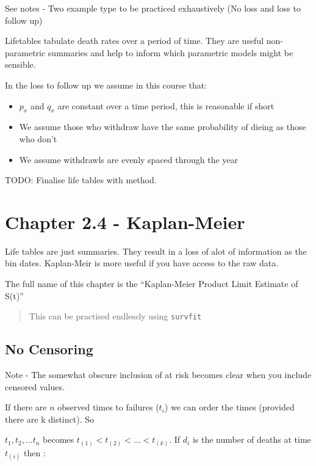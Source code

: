 \documentclass[
  letterpaper,
  DIV=11,
  numbers=noendperiod]{scrreprt}
\providecommand{\tightlist}{%
  \setlength{\itemsep}{0pt}\setlength{\parskip}{0pt}}\usepackage{longtable,booktabs,array}
\begin{document}
See notes - Two example type to be practiced exhaustively (No loss and
loss to follow up)

Lifetables tabulate death rates over a period of time. They are useful
non-parametric summaries and help to inform which parametric models
might be sensible.

In the loss to follow up we assume in this course that:

\begin{itemize}
\tightlist
\item
  \(p_x\) and \(q_x\) are constant over a time period, this is
  reasonable if short
\item
  We assume those who withdraw have the same probability of dieing as
  those who don't
\item
  We assume withdrawls are evenly spaced through the year
\end{itemize}

TODO: Finalise life tables with method.

\hypertarget{chapter-2.4---kaplan-meier}{%
\section{Chapter 2.4 - Kaplan-Meier}\label{chapter-2.4---kaplan-meier}}

Life tables are just summaries. They result in a loss of alot of
information as the bin dates. Kaplan-Meir is more useful if you have
access to the raw data.

The full name of this chapter is the ``Kaplan-Meier Product Limit
Estimate of S(t)''

\begin{quote}
This can be practised endlessly using \texttt{survfit}
\end{quote}

\hypertarget{no-censoring}{%
\subsection{No Censoring}\label{no-censoring}}

Note - The somewhat obscure inclusion of at risk becomes clear when you
include censored values.

If there are \(n\) observed times to failures (\(t_i\)) we can order the
times (provided there are k distinct). So

\(t_1, t_2, ... t_n\) becomes \(t_{(1)} < t_{(2)} < ... < t_{(k)}\). If
\(d_i\) is the number of deaths at time \(t_{(i)}\) then :
\end{document}
